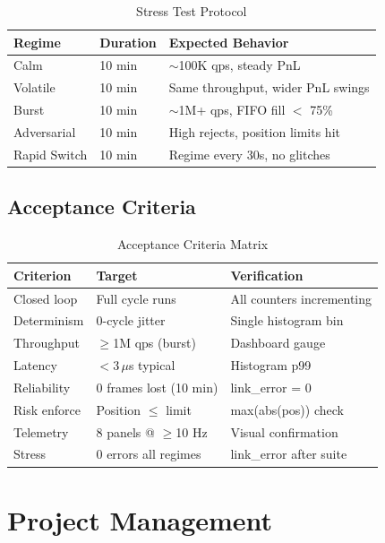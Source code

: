 \documentclass[conference]{IEEEtran}
\begin{document}
\begin{table}[h]
\centering
\caption{Stress Test Protocol}
\label{tab:stress}
\begin{tabular}{@{}lL{1.5cm}L{3.5cm}@{}}
\toprule
\textbf{Regime} & \textbf{Duration} & \textbf{Expected Behavior} \\
\midrule
Calm       & 10 min & $\sim$100K qps, steady PnL \\
Volatile   & 10 min & Same throughput, wider PnL swings \\
Burst      & 10 min & $\sim$1M+ qps, FIFO fill $<$ 75\% \\
Adversarial& 10 min & High rejects, position limits hit \\
Rapid Switch & 10 min & Regime every 30s, no glitches \\
\bottomrule
\end{tabular}
\end{table}

\subsection{Acceptance Criteria}

\begin{table}[h]
\centering
\caption{Acceptance Criteria Matrix}
\label{tab:acceptance}
\begin{tabular}{@{}L{2.2cm}L{2cm}L{2.5cm}@{}}
\toprule
\textbf{Criterion} & \textbf{Target} & \textbf{Verification} \\
\midrule
Closed loop & Full cycle runs & All counters incrementing \\
Determinism & 0-cycle jitter & Single histogram bin \\
Throughput & $\geq$1M qps (burst) & Dashboard gauge \\
Latency & $<$3\,$\mu$s typical & Histogram p99 \\
Reliability & 0 frames lost (10 min) & link\_error = 0 \\
Risk enforce & Position $\leq$ limit & max(abs(pos)) check \\
Telemetry & 8 panels @ $\geq$10 Hz & Visual confirmation \\
Stress & 0 errors all regimes & link\_error after suite \\
\bottomrule
\end{tabular}
\end{table}

\section{Project Management}
\end{document}
